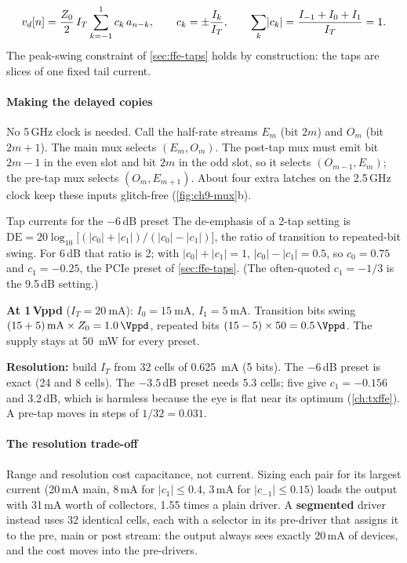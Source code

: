 \begin{keyeq}
\begin{equation}
  v_{d}[n]=\frac{Z_0}{2}\,I_T\sum_{k=-1}^{1}c_k\,a_{n-k},\qquad c_k=\pm\frac{I_k}{I_T},\qquad \sum_k\lvert c_k\rvert=\frac{I_{-1}+I_0+I_1}{I_T}=1 .
  \label{eq:ch9-ffe}
\end{equation}
The peak-swing constraint of \cref{sec:ffe-taps} holds by construction: the taps are slices of one fixed tail current.
\end{keyeq}

\paragraph{Making the delayed copies} No 5\,GHz clock is needed. Call the half-rate streams $E_m$ (bit $2m$) and $O_m$ (bit $2m+1$). The main mux selects $(E_m,O_m)$. The post-tap mux must emit bit $2m-1$ in the even slot and bit $2m$ in the odd slot, so it selects $(O_{m-1},E_m)$; the pre-tap mux selects $(O_m,E_{m+1})$. About four extra latches on the 2.5\,GHz clock keep these inputs glitch-free (\cref{fig:ch9-mux}b).

\begin{example}{Tap currents for the $-6$\,dB preset}\label{we:ch9-ffe}
The de-emphasis of a 2-tap setting is $\mathrm{DE}=20\log_{10}\big[(\lvert c_0\rvert+\lvert c_1\rvert)/(\lvert c_0\rvert-\lvert c_1\rvert)\big]$, the ratio of transition to repeated-bit swing. For 6\,dB that ratio is 2; with $\lvert c_0\rvert+\lvert c_1\rvert=1$, $\lvert c_0\rvert-\lvert c_1\rvert=0.5$, so $c_0=0.75$ and $c_1=-0.25$, the PCIe preset of \cref{sec:ffe-taps}. (The often-quoted $c_1=-1/3$ is the 9.5\,dB setting.)

\textbf{At 1\,Vppd} ($I_T=\qty{20}{\milli\ampere}$): $I_0=\qty{15}{\milli\ampere}$, $I_1=\qty{5}{\milli\ampere}$. Transition bits swing $(15+5)\,\mathrm{mA}\times\Zo=\qty{1.0}{\Vppd}$, repeated bits $(15-5)\times50=\qty{0.5}{\Vppd}$. The supply stays at \qty{50}{\milli\watt} for every preset.

\textbf{Resolution:} build $I_T$ from 32 cells of \qty{0.625}{\milli\ampere} (5 bits). The $-6$\,dB preset is exact (24 and 8 cells). The $-3.5$\,dB preset needs 5.3 cells; five give $c_1=-0.156$ and 3.2\,dB, which is harmless because the eye is flat near its optimum (\cref{ch:txffe}). A pre-tap moves in steps of $1/32=0.031$.
\end{example}

\paragraph{The resolution trade-off} Range and resolution cost capacitance, not current. Sizing each pair for its largest current (20\,mA main, 8\,mA for $\lvert c_1\rvert\le0.4$, 3\,mA for $\lvert c_{-1}\rvert\le0.15$) loads the output with 31\,mA worth of collectors, 1.55 times a plain driver. A \textbf{segmented} driver instead uses 32 identical cells, each with a selector in its pre-driver that assigns it to the pre, main or post stream: the output always sees exactly 20\,mA of devices, and the cost moves into the pre-drivers.

